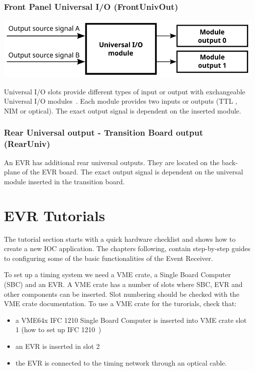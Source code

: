 \documentclass[12pt,a4paper]{article}
\begin{document}
\subsubsection{Front Panel Universal I/O (FrontUnivOut)}

	\includegraphics[]{./img/univ}

Universal I/O slots provide different types of input or output with exchangeable Universal I/O modules~\cite{mrf}. Each module provides two inputs or outputs (TTL , NIM or optical). 
The exact output signal is dependent on the inserted module.

\subsubsection{Rear Universal output - Transition Board output (RearUniv)}
An EVR has additional rear universal outputs. They are located on the back-plane of the EVR board. The exact output signal is dependent on the universal module inserted in the transition board.

\section{EVR Tutorials}
The tutorial section starts with a quick hardware checklist and shows how to create a new IOC application. The chapters following, contain step-by-step guides to configuring some of the basic functionalities of the Event Receiver.

To set up a timing system we need a VME crate, a Single Board Computer (SBC) and an EVR. A VME crate has a number of slots where SBC, EVR and other components can be inserted. Slot numbering should be checked with the VME crate documentation. To use a VME crate for the turorials, check that:
\begin{itemize}
	 \item a VME64x IFC 1210 Single Board Computer is inserted into VME crate slot 1 (how to set up IFC 1210~\cite{ifc})
	\item  an EVR is inserted in slot 2
	\item the EVR is connected to the timing network through an optical cable.
\end{itemize}
\end{document}
